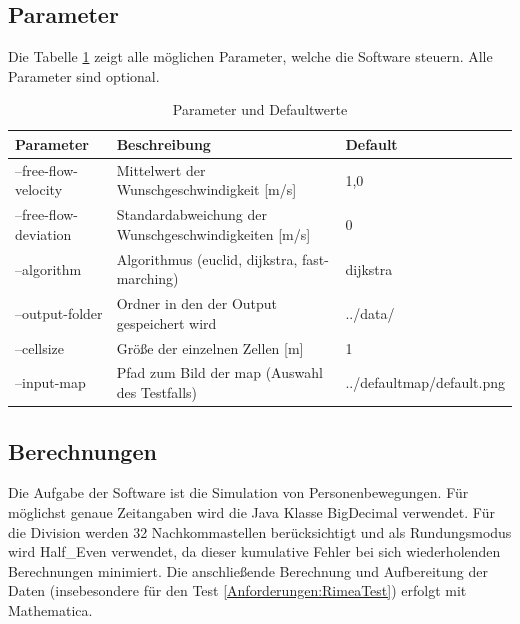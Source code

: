 \subsection{Parameter}
Die Tabelle \ref{tab:parameter} zeigt alle möglichen Parameter, welche die Software steuern. Alle Parameter sind optional.
\begin{table}[htpb]
	\centering
	\begin{tabular}{lll}
		Parameter & Beschreibung  &  Default\\ \hline
		--free-flow-velocity & Mittelwert der Wunschgeschwindigkeit [m/s] & 1,0 \\
		--free-flow-deviation & Standardabweichung der Wunschgeschwindigkeiten [m/s] & 0 \\
		--algorithm & Algorithmus (euclid, dijkstra, fast-marching) & dijkstra \\
		--output-folder & Ordner in den der Output gespeichert wird & ../data/ \\
		--cellsize & Größe der einzelnen Zellen [m] & 1 \\
		--input-map & Pfad zum Bild der map (Auswahl des Testfalls) & ../defaultmap/default.png \\
		
	\end{tabular}
	\caption{Parameter und Defaultwerte}
	\label{tab:parameter}
\end{table}
	
\subsection{Berechnungen}
Die Aufgabe der Software ist die Simulation von Personenbewegungen. Für möglichst genaue Zeitangaben wird die Java Klasse BigDecimal verwendet. Für die Division werden 32 Nachkommastellen berücksichtigt und als Rundungsmodus wird Half\_Even verwendet, da dieser kumulative Fehler bei sich wiederholenden Berechnungen minimiert. Die anschließende Berechnung und Aufbereitung der Daten (insebesondere für den Test \ref{Anforderungen:RimeaTest}) erfolgt mit Mathematica.

